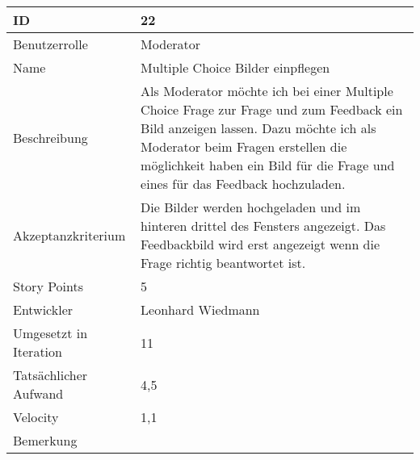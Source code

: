\begin{tabularx}{\textwidth}{|p{}|X|}
	\hline
	ID & 22\\
	\hline
	Benutzerrolle & Moderator\\
	\hline
	Name & Multiple Choice Bilder einpflegen\\
	\hline
	Beschreibung & Als Moderator möchte ich bei einer Multiple Choice Frage zur Frage und zum Feedback ein Bild anzeigen lassen. Dazu möchte ich als Moderator beim Fragen erstellen die möglichkeit haben ein Bild für die Frage und eines für das Feedback hochzuladen. \\
	\hline
	Akzeptanzkriterium & Die Bilder werden hochgeladen und im hinteren drittel des Fensters angezeigt. Das Feedbackbild wird erst angezeigt wenn die Frage richtig beantwortet ist.\\
	\hline
	Story Points & 5 \\
	\hline
	Entwickler &  Leonhard Wiedmann\\
	\hline
	Umgesetzt in Iteration & 11\\
	\hline
	Tatsächlicher Aufwand & 4,5\\
	\hline
	Velocity & 1,1\\
	\hline
	Bemerkung & \\
	\hline
\end{tabularx}
\vspace{20pt}
